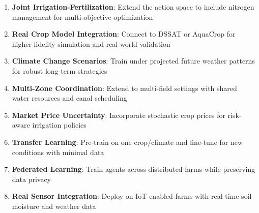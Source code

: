 \documentclass[12pt, a4paper]{article}
\begin{document}
\begin{enumerate}
    \item \textbf{Joint Irrigation-Fertilization}: Extend the action space to include nitrogen management for multi-objective optimization
    \item \textbf{Real Crop Model Integration}: Connect to DSSAT or AquaCrop for higher-fidelity simulation and real-world validation
    \item \textbf{Climate Change Scenarios}: Train under projected future weather patterns for robust long-term strategies
    \item \textbf{Multi-Zone Coordination}: Extend to multi-field settings with shared water resources and canal scheduling \cite{zhang2021multizone}
    \item \textbf{Market Price Uncertainty}: Incorporate stochastic crop prices for risk-aware irrigation policies
    \item \textbf{Transfer Learning}: Pre-train on one crop/climate and fine-tune for new conditions with minimal data \cite{gupta2022transfer}
    \item \textbf{Federated Learning}: Train agents across distributed farms while preserving data privacy
    \item \textbf{Real Sensor Integration}: Deploy on IoT-enabled farms with real-time soil moisture and weather data \cite{zhang2021iot}
\end{enumerate}
\end{document}

